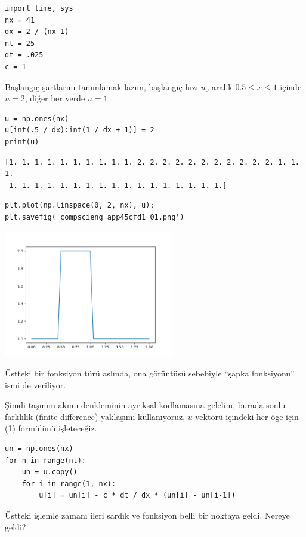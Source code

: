 \documentclass[12pt,fleqn]{article}\usepackage{../../common}
\begin{document}
\begin{verbatim}
import time, sys
nx = 41
dx = 2 / (nx-1)
nt = 25  
dt = .025
c = 1    
\end{verbatim}

Başlangıç şartlarını tanımlamak lazım, başlangıç hızı $u_0$ aralık
$0.5 \leq x \leq 1$ içinde $u = 2$, diğer her yerde $u = 1$.


\begin{verbatim}
u = np.ones(nx)
u[int(.5 / dx):int(1 / dx + 1)] = 2  
print(u)
\end{verbatim}

\begin{verbatim}
[1. 1. 1. 1. 1. 1. 1. 1. 1. 1. 2. 2. 2. 2. 2. 2. 2. 2. 2. 2. 2. 1. 1. 1.
 1. 1. 1. 1. 1. 1. 1. 1. 1. 1. 1. 1. 1. 1. 1. 1. 1.]
\end{verbatim}

\begin{verbatim}
plt.plot(np.linspace(0, 2, nx), u);
plt.savefig('compscieng_app45cfd1_01.png')
\end{verbatim}

\includegraphics[width=20em]{compscieng_app45cfd1_01.png}

Üstteki bir fonksiyon türü aslında, ona görüntüsü sebebiyle ``şapka fonksiyonu''
ismi de veriliyor.

Şimdi taşınım akımı denkleminin ayrıksal kodlamasına gelelim, burada sonlu
farklılık (finite difference) yaklaşımı kullanıyoruz, $u$ vektörü içindeki her
öge için (1) formülünü işleteceğiz.

\begin{verbatim}
un = np.ones(nx)
for n in range(nt):
    un = u.copy() 
    for i in range(1, nx):
        u[i] = un[i] - c * dt / dx * (un[i] - un[i-1])        
\end{verbatim}

Üstteki işlemle zamanı ileri sardık ve fonksiyon belli bir noktaya geldi. Nereye
geldi?
\end{document}
